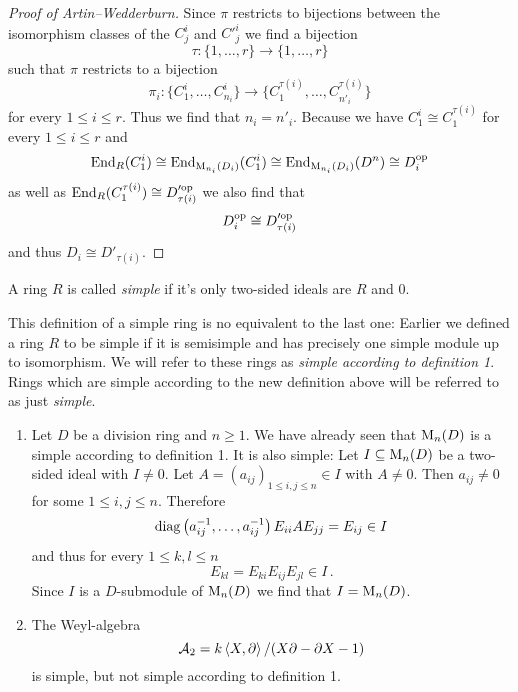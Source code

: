 \begin{proof}[Proof of Artin--Wedderburn]
  Since $\pi$ restricts to bijections between the isomorphism classes of the $C^i_j$ and $C'^i_j$ we find a bijection
  \[
            \tau
    \colon  \{1, \dotsc, r\}
    \to     \{1, \dotsc, r\}
  \]
  such that $\pi$ restricts to a bijection
  \[
            \pi_i
    \colon  \{ C^i_1, \dotsc, C^i_{n_i} \}
    \to     \{ C^{\tau(i)}_1, \dotsc, C^{\tau(i)}_{n'_i} \}
  \]
  for every $1 \leq i \leq r$.
  Thus we find that $n_i = n'_i$.
  Because we have $C^i_1 \cong C^{\tau(i)}_1$ for every $1 \leq i \leq r$ and
  \[
          \operatorname{End}_R(C^i_1)
    \cong \operatorname{End}_{\operatorname{M}_{n_i}(D_i)}(C^i_1)
    \cong \operatorname{End}_{\operatorname{M}_{n_i}(D_i)}(D^n)
    \cong D_i^{\mathrm{op}}
  \]
  as well as $\operatorname{End}_R(C^{\tau(i)}_1) \cong D_{\tau(i)}'^{\mathrm{op}}$ we also find that
  \[
          D_i^{\mathrm{op}}
    \cong D_{\tau(i)}'^{\mathrm{op}}
  \]
  and thus $D_i \cong D'_{\tau(i)}$.
\end{proof}



\begin{definition}
  A ring $R$ is called \emph{simple} if it’s only two-sided ideals are $R$ and $0$.
\end{definition}


\begin{warning}
  This definition of a simple ring is no equivalent to the last one:
  Earlier we defined a ring $R$ to be simple if it is semisimple and has precisely one simple module up to isomorphism.
  We will refer to these rings as \emph{simple according to definition 1}.
  Rings which are simple according to the new definition above will be referred to as just \emph{simple}.
\end{warning}


\begin{example}
  \begin{enumerate}[label=\emph{\alph*)},leftmargin=*]
    \item
      Let $D$ be a division ring and $n \geq 1$.
      We have already seen that $\operatorname{M}_n(D)$ is a simple according to definition 1.
      It is also simple:
      Let $I \subseteq \operatorname{M}_n(D)$ be a two-sided ideal with $I \neq 0$.
      Let $A = (a_{ij})_{1 \leq i,j \leq n} \in I$ with $A \neq 0$.
      Then $a_{ij} \neq 0$ for some $1 \leq i,j \leq n$.
      Therefore
      \[
          \operatorname{diag}\left( a_{ij}^{-1}, \dotsc, a_{ij}^{-1} \right) E_{ii} A E_{jj}
        = E_{ij} \in I
      \]
      and thus for every $1 \leq k,l \leq n$
      \[
            E_{kl}
        =   E_{ki} E_{ij} E_{jl}
        \in I \,.
      \]
      Since $I$ is a $D$-submodule of $\operatorname{M}_n(D)$ we find that $I = \operatorname{M}_n(D)$.
    \item
      The Weyl-algebra
      \[
          \mathcal{A}_2
        = k \left\langle X,\partial \right\rangle / (X \partial - \partial X - 1)
      \]
      is simple, but not simple according to definition 1.
  \end{enumerate}
\end{example}


